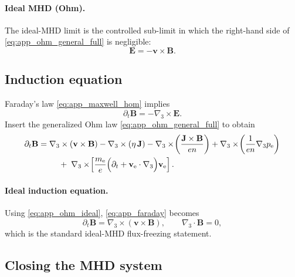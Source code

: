 \documentclass[11pt]{article}
\newcommand{\gradthree}{\nabla_3}
\newcommand{\ele}{\mathrm{e}}
\begin{document}
\paragraph{Ideal MHD (Ohm).}
The ideal-MHD limit is the controlled sub-limit in which the right-hand side of
\eqref{eq:app_ohm_general_full} is negligible:
\begin{equation}
\mathbf{E} = -\mathbf{v}\times\mathbf{B}.
\label{eq:app_ohm_ideal}
\end{equation}

\subsection{Induction equation}
\label{app:induction}

Faraday's law \eqref{eq:app_maxwell_hom} implies
\begin{equation}
\partial_t\mathbf{B} = -\gradthree\times\mathbf{E}.
\label{eq:app_faraday}
\end{equation}
Insert the generalized Ohm law \eqref{eq:app_ohm_general_full} to obtain
\begin{align}
\partial_t\mathbf{B}
&=
\gradthree\times(\mathbf{v}\times\mathbf{B})
-\gradthree\times(\eta\,\mathbf{J})
-\gradthree\times\!\left(\frac{\mathbf{J}\times\mathbf{B}}{en}\right)
+\gradthree\times\!\left(\frac{1}{en}\gradthree p_\ele\right)
\nonumber\\
&\hspace{2.5em}
+\;\gradthree\times\!\left[
\frac{m_\ele}{e}\Big(\partial_t + \mathbf{v}_\ele\cdot\gradthree\Big)\mathbf{v}_\ele
\right].
\label{eq:app_induction_general}
\end{align}

\paragraph{Ideal induction equation.}
Using \eqref{eq:app_ohm_ideal}, \eqref{eq:app_faraday} becomes
\begin{equation}
\partial_t\mathbf{B} = \gradthree\times(\mathbf{v}\times\mathbf{B}),
\qquad
\gradthree\cdot\mathbf{B}=0,
\label{eq:app_induction_ideal}
\end{equation}
which is the standard ideal-MHD flux-freezing statement.

\subsection{Closing the MHD system}
\label{app:mhd_closure}
\end{document}
